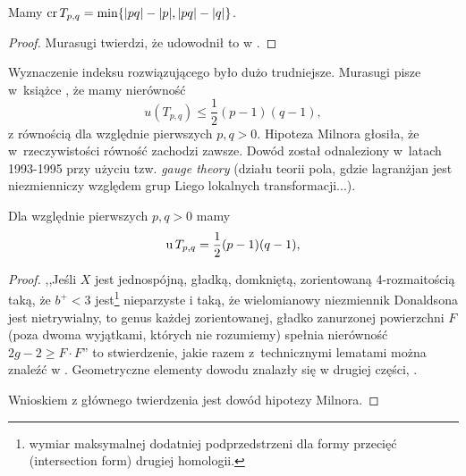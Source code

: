 \begin{proposition}
%
    Mamy $\operatorname{cr} T_{p, q} = \min \{|pq| - |p|, |pq| - |q|\}$.
\end{proposition}

\begin{proof}
%
    Murasugi twierdzi, że udowodnił to w \cite{murasugi91}.
\end{proof}

Wyznaczenie indeksu rozwiązującego było dużo trudniejsze.
Murasugi pisze w~książce \cite{murasugi96}, że mamy nierówność
\begin{equation}
    u(T_{p, q}) \le \frac 12 (p-1)(q-1),
\end{equation}
z równością dla względnie pierwszych $p, q > 0$.
Hipoteza Milnora głosiła, że w~rzeczywistości równość zachodzi zawsze.
Dowód został odnaleziony w~latach 1993-1995 przy użyciu tzw. \emph{gauge theory} (działu teorii pola, gdzie lagranżjan jest niezmienniczy względem grup Liego lokalnych transformacji...).

\begin{proposition}
%
\label{prp:torus_unknotting_number}%
    Dla względnie pierwszych $p, q > 0$ mamy
    \begin{equation}
        \operatorname{u} T_{p, q} = \frac 12 (p - 1)(q - 1),
    \end{equation}
\end{proposition}


\begin{proof}
%
    ,,Jeśli $X$ jest jednospójną, gładką, domkniętą, zorientowaną 4-rozmaitością taką, że $b^+ < 3$ jest\footnote{wymiar maksymalnej dodatniej podprzedstrzeni dla formy przecięć (intersection form) drugiej homologii.} nieparzyste i taką, że wielomianowy niezmiennik Donaldsona jest nietrywialny, to genus każdej zorientowanej, gładko zanurzonej powierzchni $F$ (poza dwoma wyjątkami, których nie rozumiemy) spełnia nierówność $2g - 2 \ge F \cdot F$'' to stwierdzenie, jakie razem z~technicznymi lematami można znaleźć w \cite{kronheimer93}.
    Geometryczne elementy dowodu znalazły się w drugiej części, \cite{kronheimer95}.

    Wnioskiem z głównego twierdzenia jest dowód hipotezy Milnora.
\end{proof}

